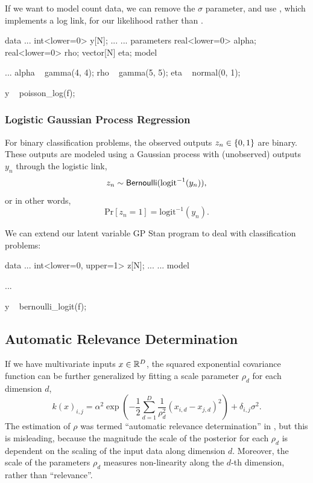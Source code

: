 If we want to model count data, we can remove the $\sigma$ parameter, and use
, which implements a log link, for our likelihood rather
than .

%
\begin{stancode}
data {
... 
  int<lower=0> y[N];
... 
}
...
parameters {
  real<lower=0> alpha;
  real<lower=0> rho;
  vector[N] eta;
}
model {
...
  alpha ~ gamma(4, 4);
  rho ~ gamma(5, 5);
  eta ~ normal(0, 1);

  y ~ poisson_log(f);
}
\end{stancode}
%

\subsubsection{Logistic Gaussian Process Regression}

For binary classification problems, the observed outputs $z_n \in
\setlist{0,1}$ are binary.  These outputs are modeled using a Gaussian
process with (unobserved) outputs $y_n$ through the logistic link,
\[
z_n \sim \distro{Bernoulli}(\mbox{logit}^{-1}(y_n)),
\]
or in other words,
\[
\mbox{Pr}[z_n = 1] = \mbox{logit}^{-1}(y_n).
\]

We can extend our latent variable GP Stan program to deal with classification
problems:

%
\begin{stancode}
data {
... 
  int<lower=0, upper=1> z[N];
... 
}
...
model {
...

  y ~ bernoulli_logit(f);
}
\end{stancode}
%

\subsection{Automatic Relevance Determination}

If we have multivariate inputs $x \in \reals^D$, the squared exponential
covariance function can be further generalized by fitting a scale
parameter $\rho_d$ for each dimension $d$,
\[
k(x)_{i, j} = \alpha^2 \exp 
\left(-\dfrac{1}{2}
\sum_{d=1}^D \dfrac{1}{\rho_d^2} (x_{i,d} - x_{j,d})^2
\right)
+ \delta_{i, j}\sigma^2.
\]
The estimation of $\rho$ was termed ``automatic relevance determination'' in
\citep{Neal:1996}, but this is misleading, because the magnitude the scale of
the posterior for each $\rho_d$ is dependent on the scaling of the input data
along dimension $d$. Moreover, the scale of the parameters $\rho_d$ measures
non-linearity along the $d$-th dimension, rather than ``relevance''.

